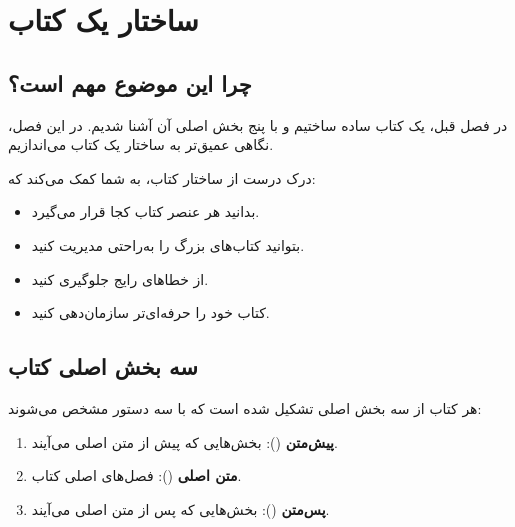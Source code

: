 
\chapter{ساختار یک کتاب}
\label{chap:book-structure}

\section{چرا این موضوع مهم است؟}
\label{sec:book-structure-why}

در فصل قبل، یک کتاب ساده ساختیم و با پنج بخش
اصلی آن آشنا شدیم. در این فصل، نگاهی عمیق‌تر به
ساختار یک کتاب  می‌اندازیم.

درک درست از ساختار کتاب، به شما کمک می‌کند که:

\begin{itemize}
    \item بدانید هر عنصر کتاب کجا قرار می‌گیرد.
    \item بتوانید کتاب‌های بزرگ را به‌راحتی مدیریت کنید.
    \item از خطاهای رایج جلوگیری کنید.
    \item کتاب خود را حرفه‌ای‌تر سازمان‌دهی کنید.
\end{itemize}


\section{سه بخش اصلی کتاب}
\label{sec:book-structure-three-parts}

هر کتاب  از سه بخش اصلی تشکیل شده
است که با سه دستور مشخص می‌شوند:

\begin{enumerate}
    \item \textbf{پیش‌متن} ():
    بخش‌هایی که پیش از متن اصلی می‌آیند.
    \item \textbf{متن اصلی} ():
    فصل‌های اصلی کتاب.
    \item \textbf{پس‌متن} ():
    بخش‌هایی که پس از متن اصلی می‌آیند.
\end{enumerate}

